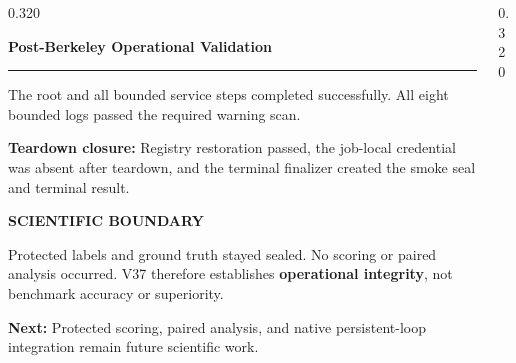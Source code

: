 \documentclass{beamer}
\newenvironment{possection}[2]{%
  \par\vspace{0.10cm}%
  \noindent{\color{ncgreendark}\bfseries\large #1}\hspace{0.42em}%
  {\color{ncink}\bfseries\large #2}\par\vspace{-0.20cm}%
  \noindent\textcolor{ncline}{\rule{\linewidth}{0.9pt}}\par\vspace{0cm}%
  \begin{minipage}{\linewidth}%
}{%
  \end{minipage}\par\vspace{0.40cm}%
}
\newcommand{\heil}[1]{{\color{ncink}\bfseries #1:}\hspace{0.3em}}
\begin{document}
\begin{frame}[t]
\begin{columns}[t,onlytextwidth]
\begin{column}{0.320\textwidth}
\begin{possection}{5.}{Post-Berkeley Operational Validation}
\begin{minipage}[t]{0.48\linewidth}
      The root and all bounded service steps completed successfully. All eight
      bounded logs passed the required warning scan.
    \end{minipage}\hfill
    \begin{minipage}[t]{0.48\linewidth}
      \small
      \heil{Teardown closure} Registry restoration passed, the job-local
      credential was absent after teardown, and the terminal finalizer created
      the smoke seal and terminal result.
    \end{minipage}
    \par\vspace{0.12cm}
    \begin{takeaway}
      {\ttfamily\footnotesize\bfseries\color{ncgreendark}\MakeUppercase{Scientific boundary}}\par
      \vspace{0.12cm}
      {\color{ncink}\small Protected labels and ground truth stayed sealed. No
      scoring or paired analysis occurred. V37 therefore establishes
      \textbf{operational integrity}, not benchmark accuracy or superiority.}
    \end{takeaway}
    \par\vspace{-0.16cm}
    {\fontsize{27}{29}\selectfont
    \heil{Next} Protected scoring, paired analysis, and native persistent-loop
    integration remain future scientific work.}
  \end{possection}

  \vspace{-0.40cm}

\end{column}

\begin{column}{0.320\textwidth}


\end{column}
\end{columns}
\end{frame}
\end{document}
